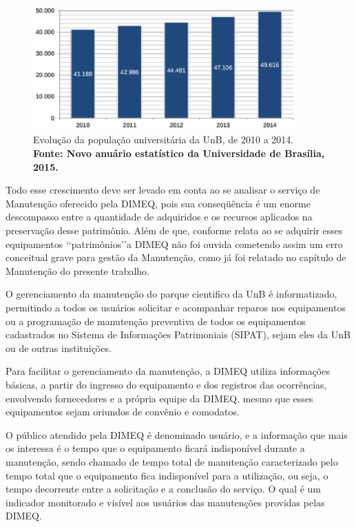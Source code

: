 \graphicspath{{figuras/}}
\begin{figure}[H]
\centering
\includegraphics[width=0.9\textwidth]{grafico_dimeq2.eps}
\caption{Evolução da população universitária da UnB, de 2010 a 2014. \textbf{Fonte: Novo anuário estatístico da Universidade de Brasília, 2015.}}
\label{grafico_dimeq2}
\end{figure}

Todo esse crescimento deve ser levado em conta ao se analisar o serviço de Manutenção oferecido pela DIMEQ, pois sua conseqüência é um enorme descompasso entre a quantidade de adquiridos e os recursos aplicados na preservação desse patrimônio. Além de que, conforme relata \cite{limacastilho2006} ao se adquirir esses equipamentos \lq\lq patrimônios\rq\rq a DIMEQ não foi ouvida cometendo assim um erro conceitual grave para gestão da Manutenção, como já foi relatado no capítulo de Manutenção do presente trabalho.
	
O gerenciamento da manutenção do parque cientifico da UnB é informatizado, permitindo a todos os usuários solicitar e acompanhar reparos nos equipamentos ou a programação de manutenção preventiva de todos os equipamentos cadastrados no Sistema de Informações Patrimoniais (SIPAT), sejam eles da UnB ou de outras instituições. 
	
Para facilitar o gerenciamento da manutenção, a DIMEQ utiliza informações básicas, a partir do ingresso do equipamento e dos registros das ocorrências, envolvendo fornecedores e a própria equipe da DIMEQ, mesmo que esses equipamentos sejam oriundos de convênio e comodatos.
	
O público atendido pela DIMEQ é denominado usuário, e a informação que mais os interessa é o tempo que o equipamento ficará indisponível durante a manutenção, sendo chamado de tempo total de manutenção caracterizado pelo tempo total que o equipamento fica indisponível para a utilização, ou seja, o tempo decorrente entre a solicitação e a conclusão do serviço. O qual é um indicador monitorado e visível aos usuários das manutenções providas pelas DIMEQ.


